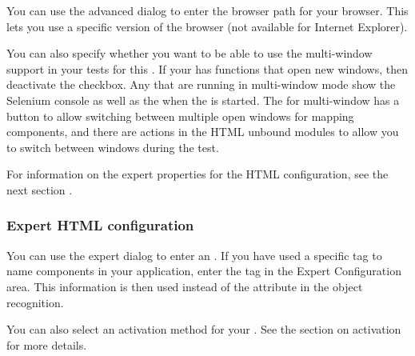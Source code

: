 You can use the advanced dialog to enter the browser path for your browser. This lets you use a specific version of the browser (not available for Internet Explorer). 

You can also specify whether you want to be able to use the multi-window support in your tests for this \gdaut{}. If your \gdaut{} has functions that open new windows, then deactivate the  checkbox. Any \gdauts{} that are running in multi-window mode show the Selenium console as well as the \gdaut{} when the \gdaut{} is started. The \gdomeditor{} for multi-window \gdauts{} has a button to allow switching between multiple open windows for mapping components, and there are  actions in the HTML unbound modules to allow you to switch between windows during the test. 

For information on the expert properties for the HTML \gdaut{} configuration, see the next section . 

\subsubsection{Expert HTML \gdaut{} configuration}
\label{ExpertAUTConfigHTML}

You can use the expert dialog to enter an  . If you have used a specific tag to name components in your application, enter the tag in the Expert Configuration area. This information is then used instead of the  attribute in the object recognition. 

You can also select an activation method for your \gdaut{}. See the section on \gdaut{} activation  for more details. 




